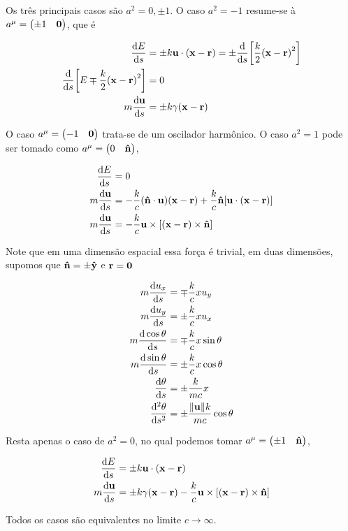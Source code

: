 \documentclass[twoside]{amsart}
\numberwithin{equation}{section}
\begin{document}
Os três principais casos são $a^2=0,\pm 1$. O caso $a^2=-1$ resume-se à $a^\mu=\mqty(\pm 1&\vb 0)$, que é

\begin{align}
    \dv{E}{s}&=\pm k\vb u\cdot \qty(\vb x-\vb r)=\pm\dv{}{s}\qty[\frac k2\qty(\vb x-\vb r)^2]\\
    \dv{}{s}\qty[E\mp\frac k2\qty(\vb x-\vb r)^2]&=0\\
     m\dv{\vb u}{s}&=\pm k\gamma\qty(\vb x-\vb r)
\end{align}

O caso $a^\mu=\mqty(- 1&\vb 0)$ trata-se de um oscilador harmônico. O caso $a^2=1$ pode ser tomado como $a^\mu=\mqty(0&\vb {\hat n})$,

\begin{align}
    \dv{E}{s}&=0\\
     m\dv{\vb u}{s}&=-\frac kc \qty(\vb {\hat n}\cdot \vb u)\qty(\vb x-\vb r)+\frac{k}{c}\vb{\hat n}\qty[\vb u\cdot \qty(\vb x-\vb r)]\\
     m\dv{\vb u}{s}&=-\frac kc\vb u\times\qty[\qty(\vb x-\vb r)\times \vb {\hat n}]
\end{align}

Note que em uma dimensão espacial essa força é trivial, em duas dimensões, supomos que $\vb{\hat  n} =\pm\vb{\hat y}$ e $\vb r=\vb 0$

\begin{align}
     m\dv{u_x}{s}&=\mp\frac kc xu_y\\
     m\dv{u_y}{s}&=\pm\frac{k}{c}xu_x\\
     m\dv{\cos\theta}{s}&=\mp\frac kc x\sin\theta\\
     m\dv{\sin\theta}{s}&=\pm\frac{k}{c}x\cos\theta\\
     \dv{\theta}{s}&=\pm\frac {k}{mc} x\\
     \dv[2]{\theta}{s}&=\pm\frac {\norm{\vb u}k}{mc}\cos\theta
\end{align}

Resta apenas o caso de $a^2=0$, no qual podemos tomar $a^\mu=\mqty(\pm 1&\vb{\hat n})$,

\begin{align}
    \dv{E}{s}&=\pm k\vb u\cdot \qty(\vb x-\vb r)\\
    m\dv{\vb u}{s}&=\pm k\gamma\qty(\vb x-\vb r)-\frac kc\vb u\times\qty[\qty(\vb x-\vb r)\times\vb {\hat n}]
\end{align}

Todos os casos são equivalentes no limite $c\rightarrow\infty$.
\end{document}
